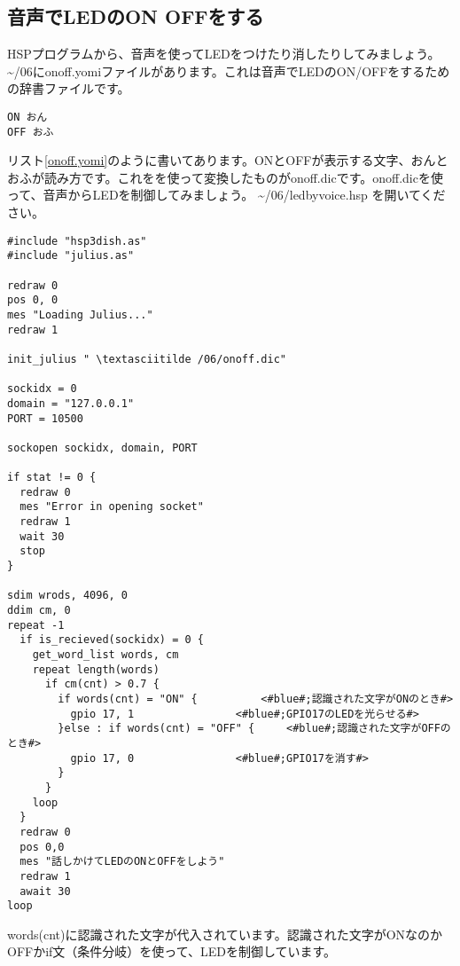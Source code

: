 \subsection{音声でLEDのON OFFをする}
HSPプログラムから、音声を使ってLEDをつけたり消したりしてみましょう。 \textasciitilde /06にonoff.yomiファイルがあります。これは音声でLEDのON/OFFをするための辞書ファイルです。\\

\begin{lstlisting}[caption=onoff.yomi,label=onoff.yomi]
ON おん
OFF おふ
\end{lstlisting}

リスト\ref{onoff.yomi}のように書いてあります。ONとOFFが表示する文字、おんとおふが読み方です。これをを使って変換したものがonoff.dicです。onoff.dicを使って、音声からLEDを制御してみましょう。 \textasciitilde /06/ledbyvoice.hsp を開いてください。\\

\begin{lstlisting}[caption=ledvoice.hsp,label=ledvoice.hsp]
#include "hsp3dish.as"
#include "julius.as"

redraw 0
pos 0, 0
mes "Loading Julius..."
redraw 1

init_julius " \textasciitilde /06/onoff.dic"

sockidx = 0
domain = "127.0.0.1"
PORT = 10500

sockopen sockidx, domain, PORT

if stat != 0 {
  redraw 0
  mes "Error in opening socket"
  redraw 1
  wait 30
  stop
}

sdim wrods, 4096, 0
ddim cm, 0
repeat -1
  if is_recieved(sockidx) = 0 {
    get_word_list words, cm
    repeat length(words)
      if cm(cnt) > 0.7 {
        if words(cnt) = "ON" {			<#blue#;認識された文字がONのとき#>
          gpio 17, 1				<#blue#;GPIO17のLEDを光らせる#>
        }else : if words(cnt) = "OFF" {		<#blue#;認識された文字がOFFのとき#>
          gpio 17, 0				<#blue#;GPIO17を消す#>
        }
      }
    loop
  }
  redraw 0
  pos 0,0
  mes "話しかけてLEDのONとOFFをしよう"
  redraw 1
  await 30
loop
\end{lstlisting}

words(cnt)に認識された文字が代入されています。認識された文字がONなのかOFFかif文（条件分岐）を使って、LEDを制御しています。\\

